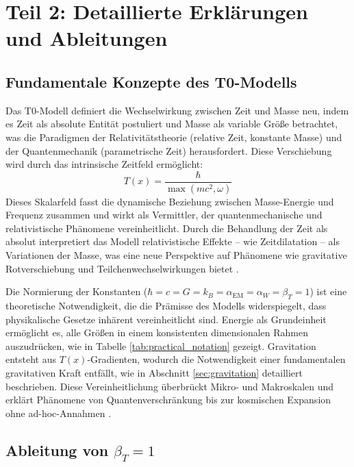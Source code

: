 \documentclass[12pt,a4paper]{article}
\newcommand{\Tfield}{T(x)}
\begin{document}
	\section{Teil 2: Detaillierte Erklärungen und Ableitungen}
	\label{sec:derivations}
	
	\subsection{Fundamentale Konzepte des T0-Modells}
	\label{subsec:concepts}
	
	Das T0-Modell definiert die Wechselwirkung zwischen Zeit und Masse neu, indem es Zeit als absolute Entität postuliert und Masse als variable Größe betrachtet, was die Paradigmen der Relativitätstheorie (relative Zeit, konstante Masse) und der Quantenmechanik (parametrische Zeit) herausfordert. Diese Verschiebung wird durch das intrinsische Zeitfeld ermöglicht:
	\[
	\Tfield = \frac{\hbar}{\max(m c^2, \omega)}
	\]
	Dieses Skalarfeld fasst die dynamische Beziehung zwischen Masse-Energie und Frequenz zusammen und wirkt als Vermittler, der quantenmechanische und relativistische Phänomene vereinheitlicht. Durch die Behandlung der Zeit als absolut interpretiert das Modell relativistische Effekte – wie Zeitdilatation – als Variationen der Masse, was eine neue Perspektive auf Phänomene wie gravitative Rotverschiebung und Teilchenwechselwirkungen bietet \cite{pascher_zeit_2025}.
	
	Die Normierung der Konstanten (\(\hbar = c = G = k_B = \alpha_{\text{EM}} = \alpha_W = \beta_T = 1\)) ist eine theoretische Notwendigkeit, die die Prämisse des Modells widerspiegelt, dass physikalische Gesetze inhärent vereinheitlicht sind. Energie als Grundeinheit ermöglicht es, alle Größen in einem konsistenten dimensionalen Rahmen auszudrücken, wie in Tabelle \ref{tab:practical_notation} gezeigt. Gravitation entsteht aus \(\Tfield\)-Gradienten, wodurch die Notwendigkeit einer fundamentalen gravitativen Kraft entfällt, wie in Abschnitt \ref{sec:gravitation} detailliert beschrieben. Diese Vereinheitlichung überbrückt Mikro- und Makroskalen und erklärt Phänomene von Quantenverschränkung bis zur kosmischen Expansion ohne ad-hoc-Annahmen \cite{pascher_emergente_2025}.
	
	\subsection{Ableitung von \(\beta_T = 1\)}
	\label{subsec:beta_derivation}
	
\end{document}
